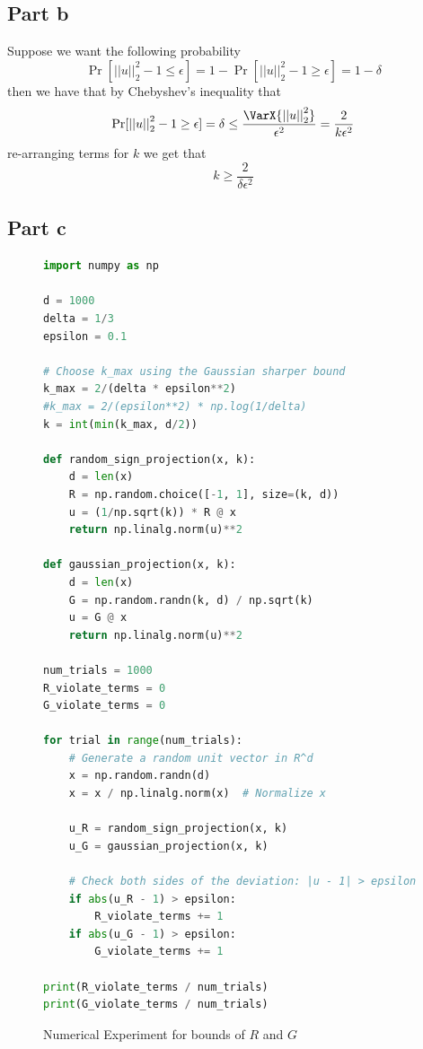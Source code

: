 \documentclass[12pt]{report}
\newcommand{\norm}[1]{\left|\left|#1\right|\right|}
\begin{document}
\subsection*{Part b}
Suppose we want the following probability 
\begin{equation*}
    \Pr[\norm{u}_2^2 - 1 \leq \epsilon] = 1 - \Pr[\norm{u}_2^2 - 1 \geq \epsilon] = 1-\delta
\end{equation*}
then we have that by Chebyshev's inequality that
\begin{equation*}
    \Pr[\norm{u}_2^2 - 1 \geq \epsilon] = \delta \leq \frac{\VarX{\norm{u}_2^2}}{\epsilon^2} = \frac{2}{k\epsilon^2}
\end{equation*}
re-arranging terms for $k$ we get that
\begin{equation*}
    k \geq \frac{2}{\delta \epsilon^2}
\end{equation*}
\subsection*{Part c}
\begin{figure}[H]
    \centering
    \begin{lstlisting}[language=python]
import numpy as np

d = 1000
delta = 1/3
epsilon = 0.1

# Choose k_max using the Gaussian sharper bound
k_max = 2/(delta * epsilon**2)
#k_max = 2/(epsilon**2) * np.log(1/delta)
k = int(min(k_max, d/2))

def random_sign_projection(x, k):
    d = len(x)
    R = np.random.choice([-1, 1], size=(k, d))
    u = (1/np.sqrt(k)) * R @ x
    return np.linalg.norm(u)**2

def gaussian_projection(x, k):
    d = len(x)
    G = np.random.randn(k, d) / np.sqrt(k)
    u = G @ x
    return np.linalg.norm(u)**2

num_trials = 1000
R_violate_terms = 0
G_violate_terms = 0

for trial in range(num_trials):
    # Generate a random unit vector in R^d
    x = np.random.randn(d)
    x = x / np.linalg.norm(x)  # Normalize x
    
    u_R = random_sign_projection(x, k)
    u_G = gaussian_projection(x, k)

    # Check both sides of the deviation: |u - 1| > epsilon
    if abs(u_R - 1) > epsilon:
        R_violate_terms += 1
    if abs(u_G - 1) > epsilon:
        G_violate_terms += 1

print(R_violate_terms / num_trials)
print(G_violate_terms / num_trials)
    \end{lstlisting}
    \caption{Numerical Experiment for bounds of $R$ and $G$}
    \label{fig:enter-label}
\end{figure}
\end{document}
